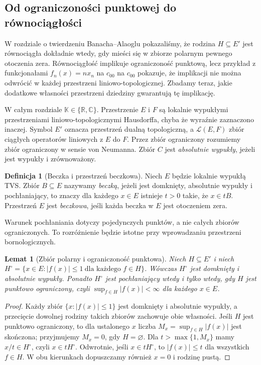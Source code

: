 \documentclass[11pt,a4paper]{article}
\numberwithin{equation}{section}
\theoremstyle{plain}
\newtheorem{lemat}[twierdzenie]{Lemat}
\theoremstyle{definition}
\newtheorem{definicja}[twierdzenie]{Definicja}
\theoremstyle{remark}
\newcommand{\R}{\mathbb R}
\newcommand{\C}{\mathbb C}
\newcommand{\K}{\mathbb K}
\begin{document}
\subsection{Od ograniczoności punktowej do równociągłości}

W rozdziale o twierdzeniu Banacha--Alaoglu pokazaliśmy, że rodzina
$H\subseteq E'$ jest równociągła dokładnie wtedy, gdy mieści się
w zbiorze polarnym pewnego otoczenia zera. Równociągłość implikuje
ograniczoność punktową, lecz przykład z funkcjonałami $f_n(x)=nx_n$ na $c_{00}$
na $c_{00}$ pokazuje, że implikacji nie można odwrócić w każdej
przestrzeni liniowo-topologicznej. Zbadamy teraz, jakie dodatkowe
własności przestrzeni dziedziny gwarantują tę implikację.

W całym rozdziale $\K\in\{\R,\C\}$. Przestrzenie $E$ i $F$
są lokalnie wypukłymi przestrzeniami liniowo-topologicznymi Hausdorffa,
chyba że wyraźnie zaznaczono inaczej. Symbol $E'$ oznacza przestrzeń
dualną topologiczną, a $\mathcal L(E,F)$ zbiór ciągłych operatorów
liniowych z $E$ do $F$. Przez zbiór ograniczony rozumiemy zbiór
ograniczony w sensie von Neumanna. Zbiór $C$ jest \emph{absolutnie
wypukły}, jeżeli jest wypukły i zrównoważony.

\begin{definicja}[Beczka i przestrzeń beczkowa]\label{def:beczka}
Niech $E$ będzie lokalnie wypukłą TVS. Zbiór $B\subseteq E$
nazywamy \emph{beczką}, jeżeli jest domknięty, absolutnie wypukły
i pochłaniający, to znaczy dla każdego $x\in E$ istnieje $t>0$
takie, że $x\in tB$. Przestrzeń $E$ jest \emph{beczkowa}, jeśli
każda beczka w $E$ jest otoczeniem zera.
\end{definicja}

Warunek pochłaniania dotyczy pojedynczych punktów, a nie całych
zbiorów ograniczonych. To rozróżnienie będzie istotne przy
wprowadzaniu przestrzeni bornologicznych.

\begin{lemat}[Zbiór polarny i ograniczoność punktowa]\label{lem:polar-barrel}
Niech $H\subseteq E'$ i niech
$H^\circ=\{x\in E:|f(x)|\le1\ \text{dla każdego }f\in H\}$.
Wówczas $H^\circ$ jest domknięty i absolutnie wypukły.
Ponadto $H^\circ$ jest pochłaniający wtedy i tylko wtedy, gdy
$H$ jest punktowo ograniczony, czyli
$\sup_{f\in H}|f(x)|<\infty$ dla każdego $x\in E$.
\end{lemat}
\begin{proof}
Każdy zbiór $\{x:|f(x)|\le1\}$ jest domknięty i absolutnie
wypukły, a przecięcie dowolnej rodziny takich zbiorów
zachowuje obie własności. Jeśli $H$ jest punktowo ograniczony,
to dla ustalonego $x$ liczba $M_x=\sup_{f\in H}|f(x)|$
jest skończona; przyjmujemy $M_x=0$, gdy $H=\varnothing$.
Dla $t>\max\{1,M_x\}$ mamy $x/t\in H^\circ$, czyli
$x\in tH^\circ$. Odwrotnie, jeśli $x\in tH^\circ$, to
$|f(x)|\le t$ dla wszystkich $f\in H$. W obu kierunkach
dopuszczamy również $x=0$ i rodzinę pustą.
\end{proof}
\end{document}
